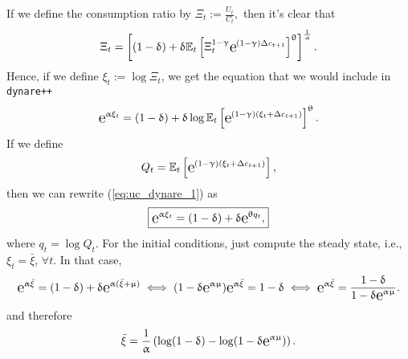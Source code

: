 	If we define the consumption ratio by
$  
\Xi_t := \frac{U_t}{C_t},
$
then it's clear that
$$
\Xi_t= \left[(1-\delta) + \delta\E_t\left[\Xi_t^{1-\gamma}\e{(1-\gamma)\Delta c_{t+1}}\right]^\theta\right]^{\frac{1}{\alpha}}.
$$
Hence, if we define $\xi_t:=\log \Xi_t$, we get the equation that we would include in \texttt{dynare++}
\begin{equation}\label{eq:uc_dynare_1}
	\e{\alpha \xi_t} = (1-\delta) + \delta\log \E_t\left[\e{(1-\gamma)(\xi_t + \Delta c_{t+1})}\right]^\theta.
\end{equation}
If we define
$$
	Q_t = \E_t\left[\e{(1-\gamma)(\xi_t + \Delta c_{t+1})}\right],
$$
then we can rewrite (\ref{eq:uc_dynare_1}) as
\begin{equation}
		\boxed{\e{\alpha \xi_t} = (1-\delta) + \delta\e{\theta q_t},} 
\end{equation}
where $q_t = \log Q_t$. For the initial conditions, just compute the steady state, i.e., $\xi_t = \bar{\xi}$, $\forall t$. In that case,
$$
	\e{\alpha \bar{\xi}} = (1-\delta) + \delta\e{\alpha(\bar{\xi}+\mu)} \iff (1-\delta\e{\alpha\mu})\e{\alpha\bar{\xi}} = 1-\delta \iff \e{\alpha\bar{\xi}} = \frac{1-\delta}{1-\delta\e{\alpha\mu}}.
$$
and therefore
\begin{equation}
	\bar{\xi} = \frac{1}{\alpha}\left(\log(1-\delta) - \log(1-\delta\e{\alpha\mu})\right).
\end{equation}
